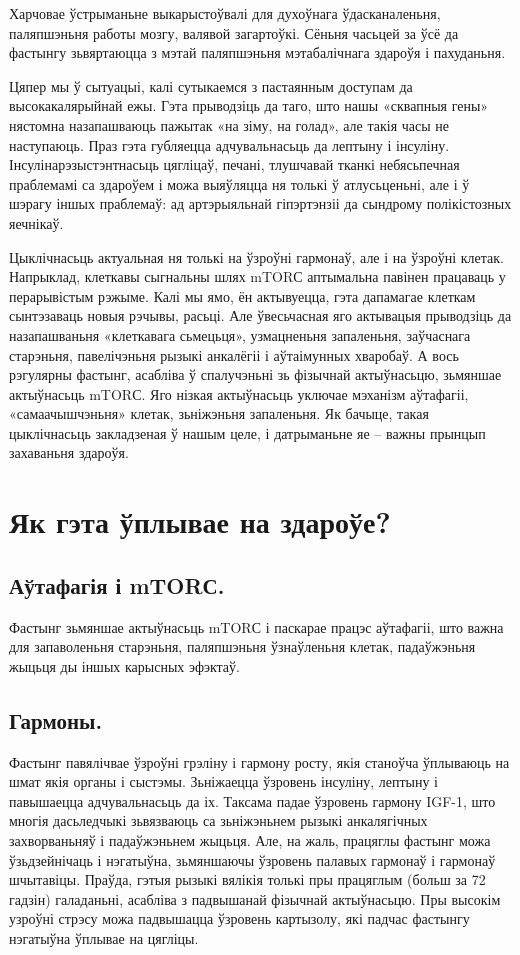 Харчовае ўстрыманьне выкарыстоўвалі для духоўнага ўдасканаленьня, паляпшэньня работы мозгу, валявой загартоўкі. Сёньня часьцей за ўсё да фастынгу зьвяртаюцца з мэтай паляпшэньня мэтабалічнага здароўя і пахуданьня.

Цяпер мы ў сытуацыі, калі сутыкаемся з пастаянным доступам да высокакалярыйнай ежы. Гэта прыводзіць да таго, што нашы «сквапныя гены» нястомна назапашваюць пажытак «на зіму, на голад», але такія часы не наступаюць. Праз гэта губляецца адчувальнасьць да лептыну і інсуліну. Інсулінарэзыстэнтнасьць цягліцаў, печані, тлушчавай тканкі небясьпечная праблемамі са здароўем і можа выяўляцца ня толькі ў атлусьценьні, але і ў шэрагу іншых праблемаў: ад артэрыяльнай гіпэртэнзіі да сындрому полікістозных яечнікаў.

Цыклічнасьць актуальная ня толькі на ўзроўні гармонаў, але і на ўзроўні клетак. Напрыклад, клеткавы сыгнальны шлях mTORС аптымальна павінен працаваць у перарывістым рэжыме. Калі мы ямо, ён актывуецца, гэта дапамагае клеткам сынтэзаваць новыя рэчывы, расьці. Але ўвесьчасная яго актывацыя прыводзіць да назапашваньня «клеткавага сьмецьця», узмацненьня запаленьня, заўчаснага старэньня, павелічэньня рызыкі анкалёгіі і аўтаімунных хваробаў. А вось рэгулярны фастынг, асабліва ў спалучэньні зь фізычнай актыўнасьцю, зьмяншае актыўнасьць mTORС. Яго нізкая актыўнасьць уключае мэханізм аўтафагіі, «самаачышчэньня» клетак, зьніжэньня запаленьня. Як бачыце, такая цыклічнасьць закладзеная ў нашым целе, і датрыманьне яе – важны прынцып захаваньня здароўя.

\section{Як гэта ўплывае на здароўе?}

\subsection{Аўтафагія і mTORС.}
Фастынг зьмяншае актыўнасьць mTORС і паскарае працэс аўтафагіі, што важна для запаволеньня старэньня, паляпшэньня ўзнаўленьня клетак, падаўжэньня жыцьця ды іншых карысных эфэктаў.

\subsection{Гармоны.}
Фастынг павялічвае ўзроўні грэліну і гармону росту, якія станоўча ўплываюць на шмат якія органы і сыстэмы. Зьніжаецца ўзровень інсуліну, лептыну і павышаецца адчувальнасьць да іх. Таксама падае ўзровень гармону IGF-1, што многія дасьледчыкі зьвязваюць са зьніжэньнем рызыкі анкалягічных захворваньняў і падаўжэньнем жыцьця. Але, на жаль, працяглы фастынг можа ўзьдзейнічаць і нэгатыўна, зьмяншаючы ўзровень палавых гармонаў і гармонаў шчытавіцы. Праўда, гэтыя рызыкі вялікія толькі пры працяглым (больш за 72 гадзін) галаданьні, асабліва з падвышанай фізычнай актыўнасьцю. Пры высокім узроўні стрэсу можа падвышацца ўзровень картызолу, які падчас фастынгу нэгатыўна ўплывае на цягліцы.

